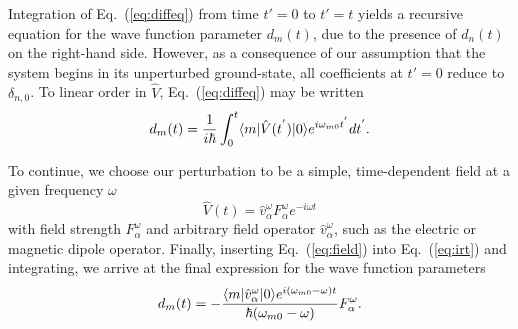 {{Integration of Eq.~(\ref{eq:diffeq}) from time $t' = 0$ to $t' = t$ yields a recursive equation for the 
wave function parameter $d_m(t)$, due to the presence of $d_n(t)$ on the right-hand side. 
However, as a consequence of our assumption that the system begins in its unperturbed ground-state, all
coefficients at $t' = 0$ reduce to $\delta_{n,0}$. To linear order in $\hat{V}$, Eq.~(\ref{eq:diffeq}) may be written
\begin{equation} \label{eq:irt}
    d_m(t) = \frac{1}{i\hbar}\int_0^t\langle m |\hat{V}(t^{'})| 0 \rangle e^{i\omega_{m0}t^{'}}dt^{'}.
\end{equation}

To continue, we choose our perturbation to be a simple, time-dependent field at a given frequency $\omega$ 
\begin{equation} \label{eq:field}
\hat{V}(t) = \hat{v}^\omega_\alpha F^\omega_\alpha e^{-i\omega t}
\end{equation}
with field strength $F^\omega_\alpha$ and arbitrary field operator $\hat{v}^\omega_\alpha$, such as the electric or magnetic dipole operator. 
Finally, inserting Eq.~(\ref{eq:field}) into Eq.~(\ref{eq:irt}) and integrating, we arrive at the final expression for the
wave function parameters
\begin{equation} \label{eq:sot}
    \begin{aligned}
        d_m(t) = -\frac{\langle m |\hat{v}^\omega_\alpha| 0 \rangle e^{i(\omega_{m0}-\omega)t}}{\hbar(\omega_{m0}-\omega)}F^{\omega}_{\alpha}.
    \end{aligned}
\end{equation}
 
}}
